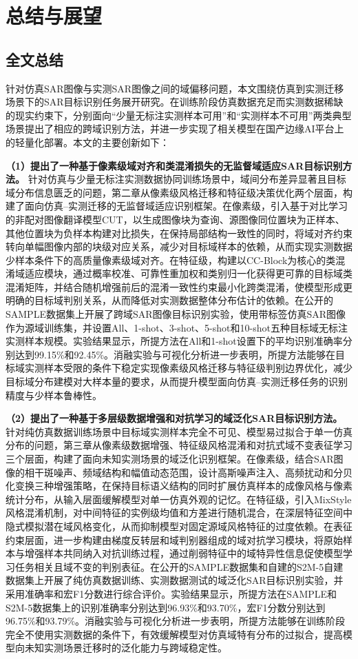 \chapter{总结与展望}

\section{全文总结}


针对仿真SAR图像与实测SAR图像之间的域偏移问题，本文围绕仿真到实测迁移场景下的SAR目标识别任务展开研究。在训练阶段仿真数据充足而实测数据稀缺的现实约束下，分别面向“少量无标注实测样本可用”和“实测样本不可用”两类典型场景提出了相应的跨域识别方法，并进一步实现了相关模型在国产边缘AI平台上的轻量化部署。本文的主要创新如下：

\textbf{（1）提出了一种基于像素级域对齐和类混淆损失的无监督域适应SAR目标识别方法。}
针对仿真与少量无标注实测数据协同训练场景中，域间分布差异显著且目标域分布信息匮乏的问题，第二章从像素级风格迁移和特征级决策优化两个层面，构建了面向仿真--实测迁移的无监督域适应识别框架。在像素级，引入基于对比学习的非配对图像翻译模型CUT，以生成图像块为查询、源图像同位置块为正样本、其他位置块为负样本构建对比损失，在保持局部结构一致性的同时，将域对齐约束转向单幅图像内部的块级对应关系，减少对目标域样本的依赖，从而实现实测数据少样本条件下的高质量像素级域对齐。在特征级，构建以CC-Block为核心的类混淆域适应模块，通过概率校准、可靠性重加权和类别归一化获得更可靠的目标域类混淆矩阵，并结合随机增强前后的混淆一致性约束最小化跨类混淆，使模型形成更明确的目标域判别关系，从而降低对实测数据整体分布估计的依赖。在公开的SAMPLE数据集上开展了跨域SAR图像目标识别实验，使用带标签仿真SAR图像作为源域训练集，并设置All、1-shot、3-shot、5-shot和10-shot五种目标域无标注实测样本规模。实验结果显示，所提方法在All和1-shot设置下的平均识别准确率分别达到99.15\%和92.45\%。消融实验与可视化分析进一步表明，所提方法能够在目标域实测样本受限的条件下稳定实现像素级风格迁移与特征级判别边界优化，减少目标域分布建模对大样本量的要求，从而提升模型面向仿真--实测迁移任务的识别精度与少样本鲁棒性。

\textbf{（2）提出了一种基于多层级数据增强和对抗学习的域泛化SAR目标识别方法。}
针对纯仿真数据训练场景中目标域实测样本完全不可见、模型易过拟合于单一仿真分布的问题，第三章从像素级数据增强、特征级风格混淆和对抗式域不变表征学习三个层面，构建了面向未知实测场景的域泛化识别框架。在像素级，结合SAR图像的相干斑噪声、频域结构和幅值动态范围，设计高斯噪声注入、高频扰动和分贝化变换三种增强策略，在保持目标语义结构的同时扩展仿真样本的成像风格与像素统计分布，从输入层面缓解模型对单一仿真外观的记忆。在特征级，引入MixStyle风格混淆机制，对中间特征的实例级均值和方差进行随机混合，在深层特征空间中隐式模拟潜在域风格变化，从而抑制模型对固定源域风格特征的过度依赖。在表征约束层面，进一步构建由梯度反转层和域判别器组成的域对抗学习模块，将原始样本与增强样本共同纳入对抗训练过程，通过削弱特征中的域特异性信息促使模型学习任务相关且域不变的判别表征。在公开的SAMPLE数据集和自建的S2M-5自建数据集上开展了纯仿真数据训练、实测数据测试的域泛化SAR目标识别实验，并采用准确率和宏F1分数进行综合评价。实验结果显示，所提方法在SAMPLE和S2M-5数据集上的识别准确率分别达到96.93\%和93.70\%，宏F1分数分别达到96.75\%和93.79\%。消融实验与可视化分析进一步表明，所提方法能够在训练阶段完全不使用实测数据的条件下，有效缓解模型对仿真域特有分布的过拟合，提高模型向未知实测场景迁移时的泛化能力与跨域稳定性。

